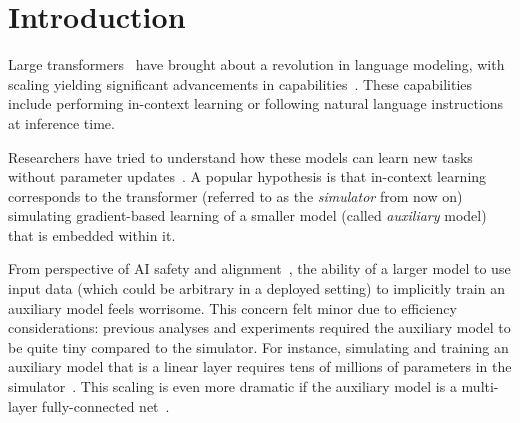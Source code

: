 \section{Introduction}
\label{sec:construction}


Large transformers~\citep{vaswani2017attention} have brought about a revolution in language modeling, with scaling yielding significant advancements in capabilities~\citep{brown2020language, chowdhery2022palm}. 
These capabilities include performing in-context learning or following natural language instructions at inference time.

Researchers have tried to understand how these models can learn new tasks without parameter updates~\citep{garg2022can,von2023uncovering,xie2022an,nanda2023progress}. 
A popular hypothesis is that in-context learning corresponds to the transformer (referred to as the {\em simulator} from now on)  simulating gradient-based learning of a smaller model (called \emph{auxiliary} model) that is embedded within it. 

From perspective of AI safety and alignment~\citep{amodei2016concrete, leike2018scalable, askell2021general}, the ability of a larger model to use input data (which could be arbitrary in a deployed setting) to implicitly train an auxiliary model  feels worrisome. 
This concern felt minor
due to efficiency considerations: previous analyses and experiments required the auxiliary model to be quite tiny compared to the simulator. 
For instance, simulating and training an auxiliary model that is a linear layer  requires tens of millions of parameters in the simulator~\citep{akyurek2022learning}. 
This scaling is even more dramatic if the auxiliary model is a multi-layer fully-connected net~\cite{giannou2023looped}. 

